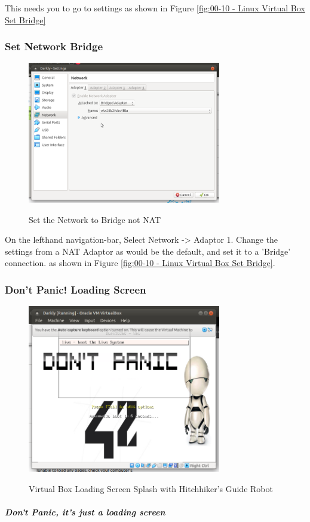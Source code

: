 This needs you to go to settings as shown in Figure \vref{fig:00-10 - Linux Virtual Box Set Bridge}

\subsubsection{Set Network Bridge}

\begin{figure}[!htb]
    \centering
    \includegraphics[width=0.752\textwidth]{images/00-10.png}\\[0cm]  
    \caption[Virtual Box]{Set the Network to Bridge not NAT}
    \label{fig:00-10 - Linux Virtual Box Set Bridge} 
\end{figure}
On the lefthand navigation-bar, Select Network -> Adaptor 1.
Change the settings from a NAT Adaptor as would be the default, and set it
to a 'Bridge' connection. as shown in Figure \vref{fig:00-10 - Linux Virtual Box Set Bridge}.

\subsubsection{Don't Panic! Loading Screen}

\begin{figure}[!htb]
    \centering
    \includegraphics[width=0.752\textwidth]{images/00-11.png}\\[0cm]  
    \caption[Virtual Box]{Virtual Box Loading Screen Splash with Hitchhiker's Guide Robot}
    \label{fig:00-11 - Linux Virtual Box LoadingScreen1} 
\end{figure}
\subparagraph{Don't Panic, it's just a loading screen}


